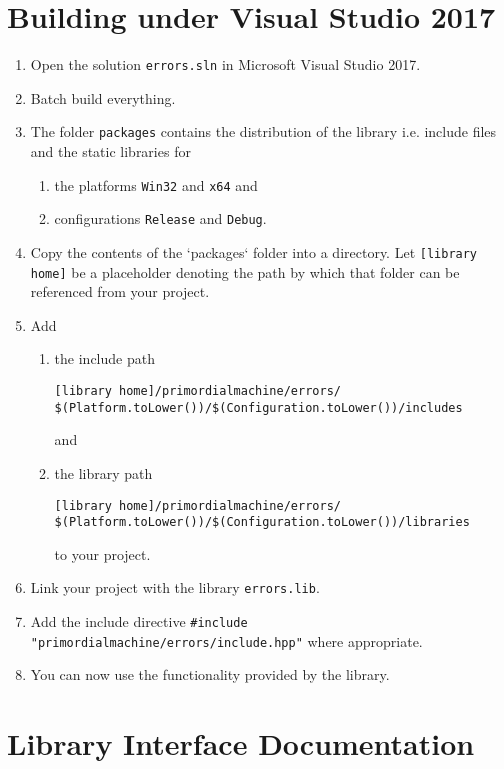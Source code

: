 \documentclass[oneside]{article}
\begin{document}
\section{Building under Visual Studio 2017}
\begin{enumerate}
\item Open the solution \texttt{errors.sln} in Microsoft Visual Studio 2017.
\item Batch build everything.
\item The folder \texttt{packages} contains the distribution of the library i.e. include files and the
      static libraries for
  \begin{enumerate}
    \item the platforms \texttt{Win32} and \texttt{x64} and
    \item configurations \texttt{Release} and \texttt{Debug}.
  \end{enumerate}
\item Copy the contents of the `packages` folder into a directory. Let
      \verb+[library home]+ be a placeholder denoting the path by which that folder
      can be referenced from your project.
\item Add
  \begin{enumerate}
    \item the include path
\begin{verbatim}
[library home]/primordialmachine/errors/
$(Platform.toLower())/$(Configuration.toLower())/includes
\end{verbatim}
	and
    \item the library path
\begin{verbatim}
[library home]/primordialmachine/errors/
$(Platform.toLower())/$(Configuration.toLower())/libraries
\end{verbatim}
    to your project.
\end{enumerate}
\item Link your project with the library \verb+errors.lib+.
\item Add the include directive \lstinline{#include "primordialmachine/errors/include.hpp"} where appropriate.
\item You can now use the functionality provided by the library.
\end{enumerate}

\section{Library Interface Documentation}
\end{document}
